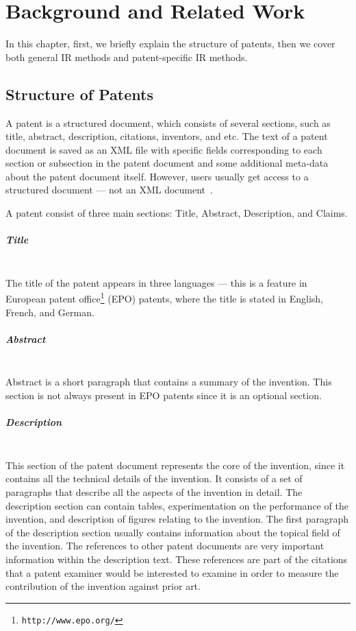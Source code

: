 \chapter{Background and Related Work}
\label{cha:background}
In this chapter, first, we briefly explain the structure of patents, then we cover both general IR methods and patent-specific IR methods.
\section{Structure of Patents}
\label{StructureofPatents}
A patent is a structured document, which consists of several sections, such as title, abstract,
description, citations, inventors, and etc. The text of a patent document is saved
as an XML file with specific fields corresponding to each
section or subsection in the patent document and some additional meta-data about the patent
document itself. However, users usually get access to a structured document --- not an
XML document~\citep{magdy2012toward}.

A patent consist of three main sections: Title, Abstract, Description, and Claims.
\paragraph{Title}
\ \\ 
The title of the patent appears in three languages --- this is a feature in European patent office\footnote{\texttt{http://www.epo.org/}} (EPO)
patents, where the title is stated in English, French, and German. 
\paragraph{Abstract}
\ \\ 
Abstract is a short paragraph that contains
a summary of the invention. This section is not always present in EPO patents since it is an
optional section.
\paragraph{Description}
\ \\ 
This section of the patent document represents the core of the invention, since it contains all the
technical details of the invention. It consists of a set of paragraphs that describe all the aspects of
the invention in detail. The description
section can contain tables, experimentation on the performance of the invention, and description 
of figures relating to the invention. The first paragraph of the description section usually contains
information about the topical field of the invention. The references to other patent
documents are very important information within the description text. 
These references are part of the citations that a patent
examiner would be interested to examine in order to measure the contribution of the invention
against prior art. 
